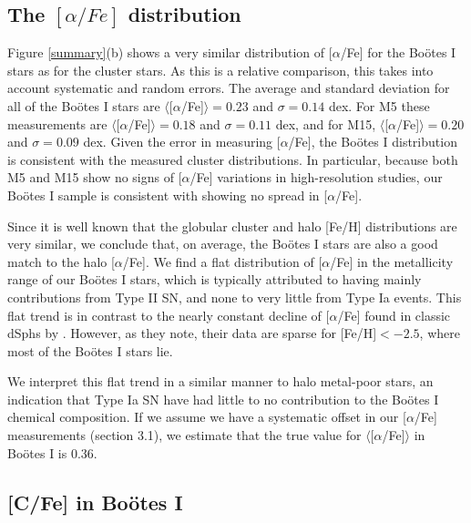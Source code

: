\documentclass[iop]{emulateapj}
\def\bootes{Bo\"{o}tes I}
\begin{document}
\subsection{The $[\alpha/Fe]$ distribution \label{alpha}}

Figure \ref{summary}(b) shows a very similar distribution of
[$\alpha$/Fe] for the \bootes{} stars as for the cluster stars. As
this is a relative comparison, this takes into account systematic and
random errors. The average and standard deviation for all of the
\bootes{} stars are $\langle$[$\alpha$/Fe]$\rangle=0.23$ and
$\sigma=0.14$ dex. For M5 these measurements are
$\langle$[$\alpha$/Fe]$\rangle=0.18$ and $\sigma=0.11$ dex, and for M15,
$\langle$[$\alpha$/Fe]$\rangle=0.20$ and $\sigma=0.09$ dex. Given the
error in measuring [$\alpha$/Fe], the \bootes{} distribution is
consistent with the measured cluster distributions. In particular,
because both M5 and M15 show no signs of [$\alpha$/Fe] variations in
high-resolution studies, our \bootes{} sample is consistent with
showing no spread in [$\alpha$/Fe].

Since it is well known that the globular cluster and halo [Fe/H]
distributions are very similar, we conclude that, on average, the
\bootes{} stars are also a good match to the halo [$\alpha$/Fe]. We
find a flat distribution of [$\alpha$/Fe] in the metallicity range of
our \bootes{} stars, which is typically attributed to having mainly
contributions from Type II SN, and none to very little from Type Ia
events. This flat trend is in contrast to the nearly constant decline
of [$\alpha$/Fe] found in classic dSphs by \citet{kirby11b}. However,
as they note, their data are sparse for [Fe/H]$<-2.5$, where most of
the \bootes{} stars lie.

We interpret this flat trend in a similar manner to halo metal-poor
stars, an indication that Type Ia SN have had little to no contribution to
the \bootes{} chemical composition. If we assume we have a systematic
offset in our [$\alpha$/Fe] measurements (section 3.1), we estimate
that the true value for $\langle$[$\alpha$/Fe]$\rangle$ in \bootes{}
is 0.36.


\subsection{[C/Fe] in \bootes{}}
\end{document}

